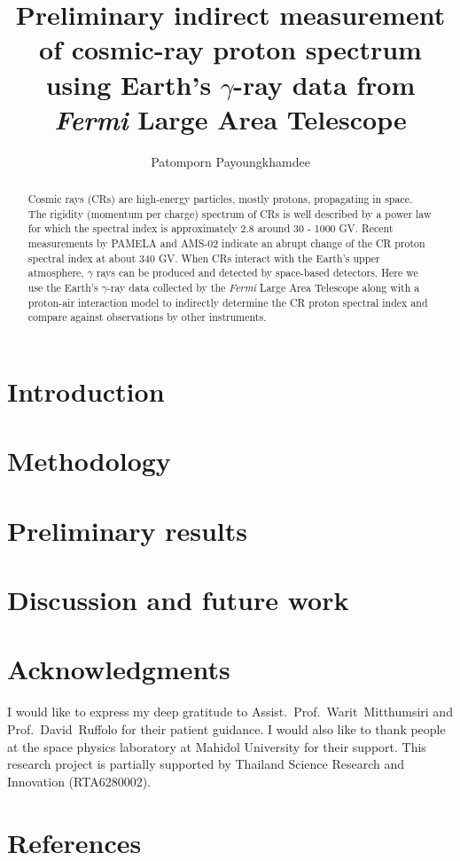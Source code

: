 \documentclass[a4paper]{jpconf}
\begin{document}
\title{Preliminary indirect measurement of cosmic-ray proton spectrum using Earth's $\gamma$-ray data from {\it Fermi} Large Area Telescope}

\author{Patomporn Payoungkhamdee}
\address{Department of Physics, Faculty of Science, Mahidol University, Bangkok 10400, Thailand}


\begin{abstract}
Cosmic rays (CRs) are high-energy particles, mostly protons, propagating in space. The rigidity (momentum per charge) spectrum of CRs is well described by a power law for which the spectral index is approximately 2.8 around 30 - 1000 GV. Recent measurements by PAMELA and AMS-02 indicate an abrupt change of the CR proton spectral index at about 340 GV. When CRs interact with the Earth's upper atmosphere, $\gamma$ rays can be produced and detected by space-based detectors. Here we use the Earth's $\gamma$-ray data collected by the {\it Fermi} Large Area Telescope along with a proton-air interaction model to indirectly determine the CR proton spectral index and compare against observations by other instruments.
\end{abstract}

\section{Introduction}


\section{Methodology}


\section{Preliminary results}


\section{Discussion and future work}




\section*{Acknowledgments}
\par I would like to express my deep gratitude to 
Assist.~Prof.~Warit~Mitthumsiri and Prof.~David~Ruffolo for their patient guidance.
I would also like to thank people at the space physics laboratory at Mahidol University
for their support.
This research project is partially supported by Thailand Science Research
and Innovation (RTA6280002).

\FloatBarrier

\section*{References}
% 

% 

\end{document}
